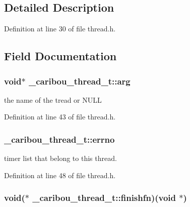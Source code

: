 \subsection{Detailed Description}


Definition at line 30 of file thread.\-h.



\subsection{Field Documentation}
\hypertarget{struct__caribou__thread__t_a35f2bbe0ed40746c1505382dbb5cd865}{
\subsubsection[{arg}]{\setlength{\rightskip}{0pt plus 5cm}void$\ast$ \-\_\-caribou\-\_\-thread\-\_\-t\-::arg}}\label{struct__caribou__thread__t_a35f2bbe0ed40746c1505382dbb5cd865}


the name of the tread or N\-U\-L\-L 



Definition at line 43 of file thread.\-h.

\hypertarget{struct__caribou__thread__t_a4a14ec3ec88fb5528f43e53686271828}{
\subsubsection[{errno}]{ \-\_\-caribou\-\_\-thread\-\_\-t\-::errno}}\label{struct__caribou__thread__t_a4a14ec3ec88fb5528f43e53686271828}


timer list that belong to this thread. 



Definition at line 48 of file thread.\-h.

\hypertarget{struct__caribou__thread__t_abf99478d61f893fa11b938c562a9ef20}{
\subsubsection[{finishfn}]{\setlength{\rightskip}{0pt plus 5cm}void($\ast$ \-\_\-caribou\-\_\-thread\-\_\-t\-::finishfn)(void $\ast$)}}\label{struct__caribou__thread__t_abf99478d61f893fa11b938c562a9ef20}


